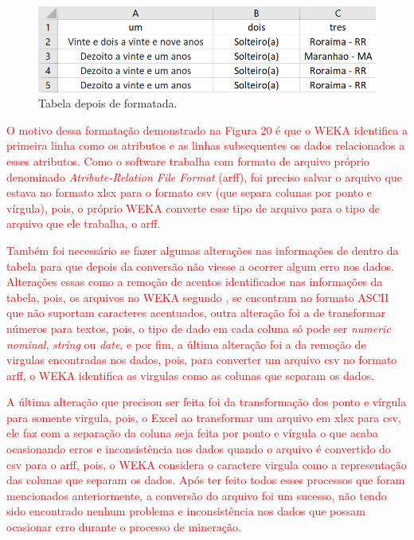 \par
\begin{figure}[!htp]
	\begin{center}
    \caption{\label{fig:waveform_fig} Tabela depois de formatada.}
	\includegraphics[scale=0.65]{Figuras/Formato_certo.png}
	\end{center}
\end{figure}

\par
\textcolor{red}{O motivo dessa formatação demonstrado na Figura 20 é que o WEKA identifica a primeira linha como os atributos e as linhas subsequentes os dados relacionados a esses atributos. Como o software trabalha com formato de arquivo próprio denominado \textit{Atribute-Relation File Format} (arff), foi preciso salvar o arquivo que estava no formato xlsx para o formato csv (que separa colunas por ponto e vírgula), pois, o próprio WEKA converte esse tipo de arquivo para o tipo de arquivo que ele trabalha, o arff.}

\par
\textcolor{red}{Também foi necessário se fazer algumas alterações nas informações de dentro da tabela para que depois da conversão não viesse a ocorrer algum erro nos dados. Alterações essas como a remoção de acentos identificados nas informações da tabela, pois, os arquivos no WEKA segundo , se encontram no formato ASCII que não suportam caracteres acentuados, outra alteração foi a de transformar números para textos, pois, o tipo de dado em cada coluna só pode ser \textit{numeric nominal}, \textit{string} ou \textit{date}, e por fim, a última alteração foi a da remoção de virgulas encontradas nos dados, pois, para converter um arquivo csv no formato arff, o WEKA identifica as virgulas como as colunas que separam os dados.}

\par
\textcolor{red}{A última alteração que precisou ser feita foi da transformação dos ponto e vírgula para somente virgula, pois, o Excel ao transformar um arquivo em xlsx para csv, ele faz com a separação da coluna seja feita por ponto e vírgula o que acaba ocasionando erros e inconsistência nos dados quando o arquivo é convertido do csv para o arff, pois, o WEKA considera o caractere virgula como a representação das colunas que separam os dados. Após ter feito todos esses processos que foram mencionados anteriormente, a conversão do arquivo foi um sucesso, não tendo sido encontrado nenhum problema e inconsistência nos dados que possam ocasionar erro durante o processo de mineração.}


